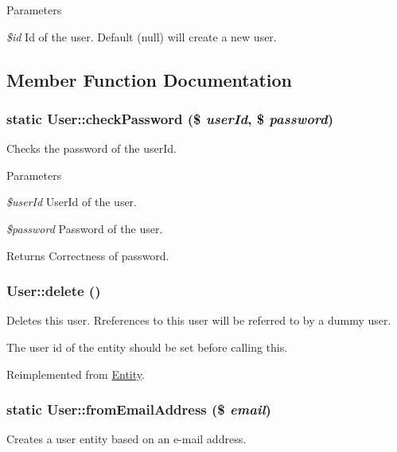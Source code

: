 \begin{DoxyParams}{Parameters}
\item[{\em \$id}]Id of the user. Default (null) will create a new user. \end{DoxyParams}


\subsection{Member Function Documentation}
\hypertarget{classUser_a656643953ca080f90ba0918c4bd84228}{
\subsubsection[{checkPassword}]{\setlength{\rightskip}{0pt plus 5cm}static User::checkPassword (\$ {\em userId}, \/  \$ {\em password})}}
\label{classUser_a656643953ca080f90ba0918c4bd84228}
Checks the password of the userId.


\begin{DoxyParams}{Parameters}
\item[{\em \$userId}]UserId of the user. \item[{\em \$password}]Password of the user.\end{DoxyParams}
\begin{DoxyReturn}{Returns}
Correctness of password. 
\end{DoxyReturn}
\hypertarget{classUser_a87accb91013ff60d7ecdc1b1f6c02364}{
\subsubsection[{delete}]{\setlength{\rightskip}{0pt plus 5cm}User::delete ()}}
\label{classUser_a87accb91013ff60d7ecdc1b1f6c02364}
Deletes this user. Rreferences to this user will be referred to by a dummy user.

The user id of the entity should be set before calling this. 

Reimplemented from \hyperlink{classEntity_a59eae3c476f3996973400a024097c87e}{Entity}.

\hypertarget{classUser_a62f4d6923d634fe4e8cfba77c83fa170}{
\subsubsection[{fromEmailAddress}]{\setlength{\rightskip}{0pt plus 5cm}static User::fromEmailAddress (\$ {\em email})}}
\label{classUser_a62f4d6923d634fe4e8cfba77c83fa170}
Creates a user entity based on an e-\/mail address.


